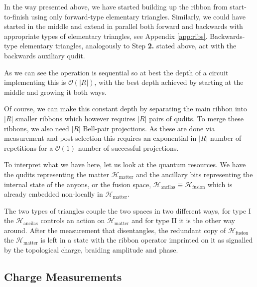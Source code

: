 \documentclass[two column]{article}
\newcommand{\caro}[1]{\textcolor{red}{[#1]}}
\newcommand{\jovan}[1]{\textcolor{blue}{[#1]}}
\begin{document}
In the way presented above, we have started building up the ribbon from start-to-finish using only forward-type elementary triangles. Similarly, we could have started in the middle and extend in parallel both forward and backwards with appropriate types of elementary triangles, see Appendix \ref{app:ribs}. Backwards-type elementary triangles, analogously to Step \textbf{2.} stated above, act with the backwards auxiliary qudit.

As we can see the operation is sequential so at best the depth of a circuit implementing this is $\mathcal{O}(|R|)$, with the best depth achieved by starting at the middle and growing it both ways.

Of course, we can make this constant depth by separating the main ribbon into $|R|$ smaller ribbons which however requires $|R|$ pairs of qudits. To merge these ribbons, we also need $|R|$ Bell-pair projections. As these are done via measurement and post-selection this requires an exponential in $|R|$ number of repetitions for a $\mathcal{O}(1)$ number of successful projections.

To interpret what we have here, let us look at the quantum resources. We have the qudits representing the matter $\mathcal{H}_{\text{matter}}$ and the ancillary bits representing the internal state of the anyons, or the fusion space, $\mathcal{H}_{\text{ancilas}} \equiv \mathcal{H}_{\text{fusion}}$ which is already embedded non-locally in  $\mathcal{H}_{\text{matter}}$.

The two types of triangles couple the two spaces in two different ways, for type I the $\mathcal{H}_{\text{ancilas}}$ controls an action on $\mathcal{H}_{\text{matter}}$ and for type II it is the other way around. After the measurement that disentangles, the redundant copy of $\mathcal{H}_{\text{fusion}}$ the $\mathcal{H}_{\text{matter}}$ is left in a state with the ribbon operator imprinted on it as signalled by the topological charge, braiding amplitude and phase.


\subsection{Charge Measurements}
\end{document}
